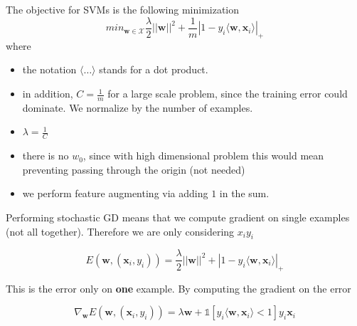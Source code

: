     The objective for SVMs is the following minimization
    $$min_{\pmb{w} \in \mathcal{X}} \frac{\lambda}{2} ||\pmb{w}||^2 + \frac{1}{m} |1 - y_i \langle \pmb{w}, \pmb{x}_i \rangle|_{+}$$
    where
    \begin{itemize}
        \item the notation $\langle \dots \rangle$ stands for a dot product.
        \item in addition, $C = \frac{1}{m}$ for a large scale problem, since the training error could dominate. We normalize by the number of examples.
        \item $\lambda = \frac{1}{C}$
        \item there is no $w_0$, since with high dimensional problem this would mean preventing passing through the origin (not needed)
        \item we perform feature augmenting via adding $1$ in the sum.
    \end{itemize}
    Performing stochastic GD means that we compute gradient on single examples (not all together). Therefore we are only considering $x_i y_i$

    $$E(\pmb{w}, (\pmb{x}_i, y_i)) = \frac{\lambda}{2} ||\pmb{w}||^2 + |1 - y_i \langle \pmb{w}, \pmb{x}_i \rangle|_{+}$$

    This is the error only on \textbf{one} example. By computing the gradient on the error 
    
     $$\nabla_{\pmb{w}} E(\pmb{w}, (\pmb{x}_i, y_i)) = 
     \lambda \pmb{w} + \mathbb{1} [y_i \langle \pmb{w}, \pmb{x}_i \rangle < 1] y_i \pmb{x}_i$$

